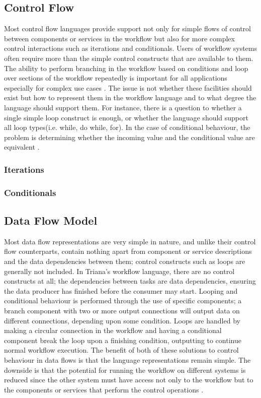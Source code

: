 \subsection{Control Flow}\label{ch1:opts}
Most control flow languages provide support not only for simple flows of control between components or services in the workflow but also for more complex control interactions such as iterations and conditionals. Users of workflow systems often require more than the simple control constructs that are available to them. The ability to perform branching in the workflow based on conditions and loop over sections of the workflow repeatedly is important for all applications especially for complex use cases \cite{deelman2009workflows}. The issue is not whether these facilities should exist but how to represent them in the workflow language and to what degree the language should support them. For instance, there is a question to whether a single simple loop construct is  enough, or whether the language should support all loop types(i.e. while, do while, for). In the case of conditional behaviour, the problem is determining whether the incoming value and the conditional value are equivalent \cite{deelman2009workflows}. 

\subsubsection{Iterations}

\subsubsection{Conditionals}

\subsection{Data Flow Model}
Most data flow representations are very simple in nature, and unlike their control flow counterparts, contain nothing apart from component or service descriptions and the data dependencies between them; control constructs such as loops are generally not included. In Triana’s workflow language, there are no control constructs at all; the dependencies between tasks are data dependencies, ensuring the data producer has finished before the consumer may start. Looping and conditional behaviour is performed through the use of specific components; a branch component with two or more output connections will output data on different connections, depending upon some condition. Loops are handled by making a circular connection in the workflow and having a conditional component break the loop upon a finishing condition, outputting to continue normal workflow execution. The benefit of both of these solutions to control behaviour in data flows is that the language representations remain simple. The downside is that the potential for running the workflow on different systems is reduced since the other system must have access not only to the workflow but to the components or services that perform the control operations \cite{deelman2009workflows}.

